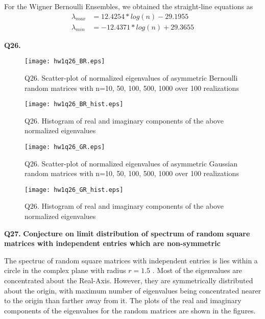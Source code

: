 \documentclass[11pt]{article}
\begin{document}
For the Wigner Bernoulli Ensembles, we obtained the straight-line equations as
\begin{align*}
\lambda_{max} &= 12.4254 *log(n) - 29.1955 \\
\lambda_{min} &= -12.4371 *log(n) + 29.3655 
\end{align*}


\textbf{Q26. }

\begin{figure}[h!]
\centering
\texttt{[image: hw1q26\_BR.eps]}\\
\caption{Q26. Scatter-plot of normalized eigenvalues of asymmetric Bernoulli random matrices with n={10, 50, 100, 500, 1000} over 100 realizations}
\label{fig:que26_BR}
\end{figure}

\begin{figure}[h!]
\centering
\texttt{[image: hw1q26\_BR\_hist.eps]}\\
\caption{Q26. Histogram of real and imaginary components of the above normalized eigenvalues}
\label{fig:que26_BR_hist}
\end{figure}

\begin{figure}[h!]
\centering
\texttt{[image: hw1q26\_GR.eps]}\\
\caption{Q26. Scatter-plot of normalized eigenvalues of asymmetric Gaussian random matrices with n={10, 50, 100, 500, 1000} over 100 realizations}
\label{fig:que26_GR}
\end{figure}

\begin{figure}[h!]
\centering
\texttt{[image: hw1q26\_GR\_hist.eps]}\\
\caption{Q26. Histogram of real and imaginary components of the above normalized eigenvalues}
\label{fig:que26_GR_hist}
\end{figure}

\hrulefill


\textbf{Q27. }
\textbf{Conjecture on limit distribution of spectrum of random square matrices with independent entries which are non-symmetric} 

The spectruc of random square matrices with independent entries is lies within a circle in the complex plane with radius $r=1.5$ . Most of the eigenvalues are concentrated about the Real-Axis. However, they are symmetrically distributed about the origin, with maximum number of eigenvalues being concentrated nearer to the origin than farther away from it. The plots of the real and imaginary components of the eigenvalues for the random matrices are shown in the figures. 
 
\end{document}
